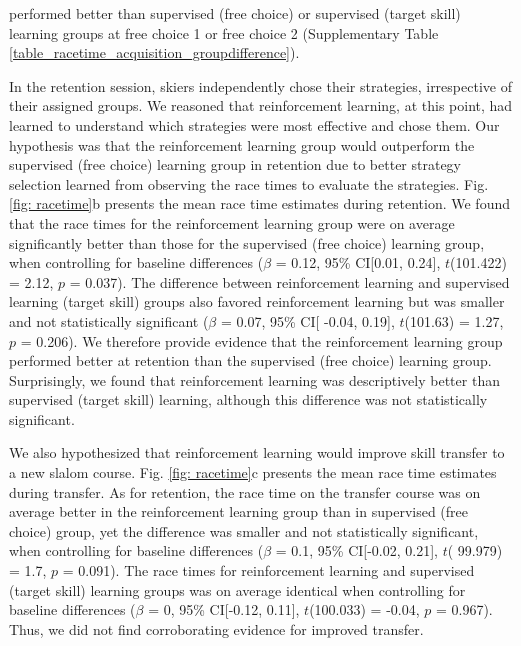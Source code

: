 \documentclass[pdflatex,sn-mathphys-num]{sn-jnl}%
\theoremstyle{thmstyleone}%
\theoremstyle{thmstyletwo}%
\theoremstyle{thmstylethree}%
\begin{document}
performed better than supervised (free choice) or supervised (target skill) learning groups at free choice 1 or free choice 2 (Supplementary Table \ref{table_racetime_acquisition_groupdifference}). 

In the retention session, skiers independently chose their strategies, irrespective of their assigned groups. We reasoned that reinforcement learning, at this point, had learned to understand which strategies were most effective and chose them. Our hypothesis was that the reinforcement learning group would outperform the supervised (free choice) learning group in retention due to better strategy selection learned from observing the race times to evaluate the strategies. Fig. \ref{fig: racetime}b presents the mean race time estimates during retention. We found that the race times for the reinforcement learning group were on average significantly better than those for the supervised (free choice) learning group, when controlling for baseline differences ($\beta$ = 0.12, 95\% CI[0.01, 0.24], $t$(101.422) = 2.12, $p$ = 0.037). The difference between reinforcement learning and supervised learning (target skill) groups also favored reinforcement learning but was smaller and not statistically significant ($\beta$ = 0.07, 95\% CI[ -0.04, 0.19], $t$(101.63) = 1.27, $p$ = 0.206). We therefore provide evidence that the reinforcement learning group performed better at retention than the supervised (free choice) learning group. Surprisingly, we found that reinforcement learning was descriptively better than supervised (target skill) learning, although this difference was not statistically significant.

We also hypothesized that reinforcement learning would improve skill transfer to a new slalom course. Fig. \ref{fig: racetime}c presents the mean race time estimates during transfer. As for retention, the race time on the transfer course was on average better in the reinforcement learning group than in supervised (free choice) group, yet the difference was smaller and not statistically significant, when controlling for baseline differences ($\beta$ = 0.1, 95\% CI[-0.02, 0.21], $t$( 99.979) = 1.7, $p$  = 0.091). The race times for reinforcement learning and supervised (target skill) learning groups was on average identical when controlling for baseline differences ($\beta$ = 0, 95\% CI[-0.12, 0.11], $t$(100.033) = -0.04, $p$ = 0.967). Thus, we did not find corroborating evidence for improved transfer.
\end{document}
